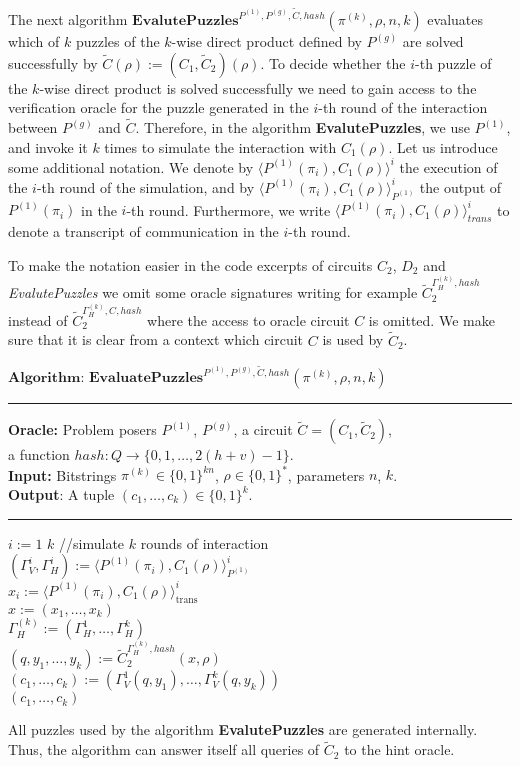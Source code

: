 %
%
The next algorithm $\textbf{EvalutePuzzles}^{P^{(1)}, P^{(g)}, \widetilde{C}, hash}(\pi^{(k)}, \rho, n, k)$
evaluates which of $k$ puzzles of the $k$-wise direct product defined by $P^{(g)}$ are solved successfully by $\widetilde{C}(\rho) := (C_1,\widetilde{C}_2)(\rho)$.
To decide whether the $i$-th puzzle of the $k$-wise direct product is solved successfully we need to gain access to the verification oracle
for the puzzle generated in the $i$-th round of the interaction between $P^{(g)}$ and $\widetilde{C}$.
Therefore, in the algorithm \textbf{EvalutePuzzles}, we use $P^{(1)}$, and invoke it $k$ times to simulate the interaction with $C_1(\rho)$.
Let us introduce some additional notation. We denote by $\langle P^{(1)}(\pi_i), C_1(\rho)\rangle^i$ the execution of
the $i$-th round of the simulation, and by $\langle P^{(1)}(\pi_i), C_1(\rho)\rangle^i_{P^{(1)}}$ the output of $P^{(1)}(\pi_i)$ in the $i$-th round.
Furthermore, we write $\langle P^{(1)}(\pi_i), C_1(\rho)\rangle^i_{trans}$ to denote a transcript of communication in the $i$-th round.
%

To make the notation easier in the code excerpts of circuits $C_2$, $D_2$ and \textit{EvalutePuzzles} we
omit some oracle signatures writing for example $\widetilde{C}_2^{\Gamma_H^{(k)}, hash}$ instead of $\widetilde{C}_2^{\Gamma_H^{(k)}, C, hash}$ where
the access to oracle circuit $C$ is omitted. We make sure that it is clear from a context which circuit $C$ is used by $\widetilde{C}_2$.

\begin{codeblock}
  $\textbf{Algorithm: EvaluatePuzzles}^{P^{(1)}, P^{(g)}, \widetilde{C}, hash}(\pi^{(k)}, \rho, n, k)$
  \medskip \hrule \medskip
  \textbf{Oracle:}  Problem posers $P^{(1)}$, $P^{(g)}$, a circuit $\widetilde{C} = (C_1, \widetilde{C}_2)$,\\
  \IndII a function $hash : Q \rightarrow \{0,1,\dots, 2(h+v)-1\}$.\\
  \textbf{Input:} Bitstrings $\pi^{(k)} \in \{0,1\}^{kn}$, $\rho \in \{0,1\}^{*}$, parameters $n$, $k$.\\
  \textbf{Output}: A tuple $(c_1, \dots, c_k) \in \{0,1\}^{k}$.
  \medskip\hrule\medskip
  \For $i:=1$ \To $k$ \Do \IndII //simulate $k$ rounds of interaction \\
  \IndI $(\Gamma_V^{i}, \Gamma_H^{i}) := \langle P^{(1)}(\pi_i), C_1(\rho) \rangle_{P^{(1)}}^i$\\
  \IndI $x_i := \langle P^{(1)}(\pi_i), C_1(\rho) \rangle^i_{\text{trans}}$ \\
  $x := (x_1, \dots, x_k)$ \\
  $\Gamma_H^{(k)} := (\Gamma_H^1, \dots, \Gamma_H^k)$ \\
  $(q, y_1, \dots, y_k) := \widetilde{C}_2^{\Gamma_H^{(k)}, hash} (x, \rho)$ \\
  $(c_1, \dots, c_k) := (\Gamma_V^{1}(q, y_1), \dots, \Gamma_V^{k}(q, y_k))$\\
  \Return $(c_1, \dots, c_k)$
\end{codeblock}
%
All puzzles used by the algorithm \textbf{EvalutePuzzles} are generated internally.
Thus, the algorithm can answer itself all queries of $\widetilde{C}_2$ to the hint oracle.

